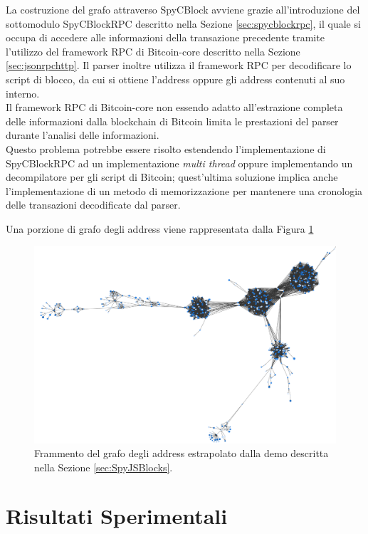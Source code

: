  La costruzione del grafo attraverso SpyCBlock avviene grazie all'introduzione del sottomodulo SpyCBlockRPC descritto nella Sezione \ref{sec:spycblockrpc}, il quale si occupa di accedere alle informazioni della transazione precedente tramite l'utilizzo del framework RPC di Bitcoin-core descritto nella Sezione \ref{sec:jsonrpchttp}.
 Il parser inoltre utilizza il framework RPC per decodificare lo script di blocco, da cui si ottiene l'address oppure gli address contenuti al suo interno.\\
 Il framework RPC di Bitcoin-core non essendo adatto all'estrazione completa delle informazioni dalla blockchain di Bitcoin limita le prestazioni del parser durante l'analisi delle informazioni.\\
 Questo problema potrebbe essere risolto estendendo l'implementazione di SpyCBlockRPC ad un implementazione \emph{multi thread} oppure implementando un decompilatore per gli script di Bitcoin; quest'ultima soluzione implica anche l'implementazione di un metodo di memorizzazione per mantenere una cronologia delle transazioni decodificate dal parser.

 Una porzione di grafo degli address viene rappresentata dalla Figura \ref{fig:addressGraph}

\begin{figure}
\centering
 \includegraphics[scale=0.25]{images/demo/address_graph.png}
 \caption{Frammento del grafo degli address estrapolato dalla demo descritta nella Sezione \ref{sec:SpyJSBlocks}.}\label{fig:addressGraph}
\end{figure}

\section{Risultati Sperimentali} \label{sec:valutazionesperimentale}

